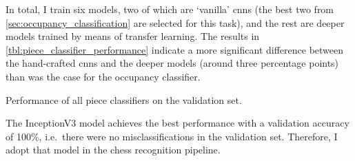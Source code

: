 \documentclass[../report.tex]{subfiles}
\begin{document}
In total, I train six models, two of which are `vanilla' \glspl{cnn} (the best two from \cref{sec:occupancy_classification} are selected for this task), and the rest are deeper models trained by means of transfer learning.
The results in \cref{tbl:piece_classifier_performance} indicate a more significant difference between the hand-crafted \glspl{cnn} and the deeper models (around three percentage points) than was the case for the occupancy classifier.
\begin{table}
    \centering
    \caption[Performance of all piece classifiers on the validation set.]{
        Performance of all piece classifiers on the validation set.
    }
    \label{tbl:piece_classifier_performance}
\end{table}
The InceptionV3 model achieves the best performance with a validation accuracy of 100\%, i.e.\ there were no misclassifications in the validation set.
Therefore, I adopt that model in the chess recognition pipeline.
\end{document}
